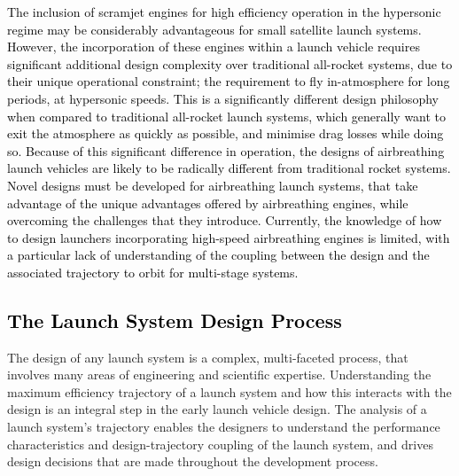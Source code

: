     \textcolor{black}{The inclusion of scramjet engines for high efficiency operation in the hypersonic regime may be considerably advantageous for small satellite launch systems. However, the incorporation of these engines within a launch vehicle requires significant additional design complexity over traditional all-rocket systems, due to their unique operational constraint; the requirement to fly in-atmosphere for long periods, at hypersonic speeds.
    This is a significantly different design philosophy when compared to traditional all-rocket launch systems, which generally want to exit the atmosphere as quickly as possible, and minimise drag losses while doing so. Because of this significant difference in operation, the designs of airbreathing launch vehicles are likely to be radically different from traditional rocket systems. Novel designs must be developed for airbreathing launch systems, that take advantage of the unique advantages offered by airbreathing engines, while overcoming the challenges that they introduce. 
    Currently, the knowledge of how to design launchers incorporating high-speed airbreathing engines is limited, with a particular lack of understanding of the coupling between the design and the associated trajectory to orbit for multi-stage systems. 
    	}
    
    
    
    
    
    \textcolor{black}{
    	\section{The Launch System Design Process}
    }
    \noindent
    The design of any launch system is a complex, multi-faceted process, that involves many areas of engineering and scientific expertise. Understanding the maximum efficiency trajectory of a launch system and how this interacts with the design is an integral step in the early launch vehicle design. The analysis of a launch system's trajectory enables the designers to understand the performance characteristics and design-trajectory coupling of the launch system, and drives design decisions that are made throughout the development process. 
    
